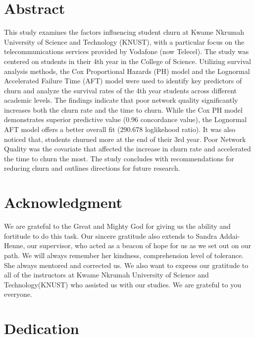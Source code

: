 \documentclass[doublespacing,12pt]{report}
\begin{document}
\newpage
\chapter*{Abstract}

This study examines the factors influencing student churn at Kwame Nkrumah University of Science and Technology (KNUST), with a particular focus on the telecommunications services provided by Vodafone (now Telecel). The study was centered on students in their 4th year in the College of Science. Utilizing survival analysis methods, the Cox Proportional Hazards (PH) model and the Lognormal Accelerated Failure Time (AFT) model were used to identify key predictors of churn and analyze the survival rates of the 4th year students across different academic levels. The findings indicate that poor network quality significantly increases both the churn rate and the time to churn. While the Cox PH model demonstrates superior predictive value (0.96 concordance value), the Lognormal AFT model offers a better overall fit (290.678 loglikehood ratio). It was also noticed that, students churned more at the end of their 3rd year. Poor Network Quality was the covariate that affected the increase in churn rate and accelerated the time to churn the most. The study concludes with recommendations for reducing churn and outlines directions for future research.


\newpage
\chapter*{Acknowledgment}

We are grateful to the Great and Mighty God for giving us the ability and fortitude to do this task. Our sincere gratitude also extends to Sandra Addai-Henne, our supervisor, who acted as a beacon of hope for us as we set out on our path. We will always remember her kindness, comprehension level of tolerance. She always mentored and corrected us. We also want to express our gratitude to all of the instructors at Kwame Nkrumah University of Science and Technology(KNUST) who assisted us with our studies. We are grateful to you everyone.  



\newpage
\chapter*{Dedication}
\end{document}
